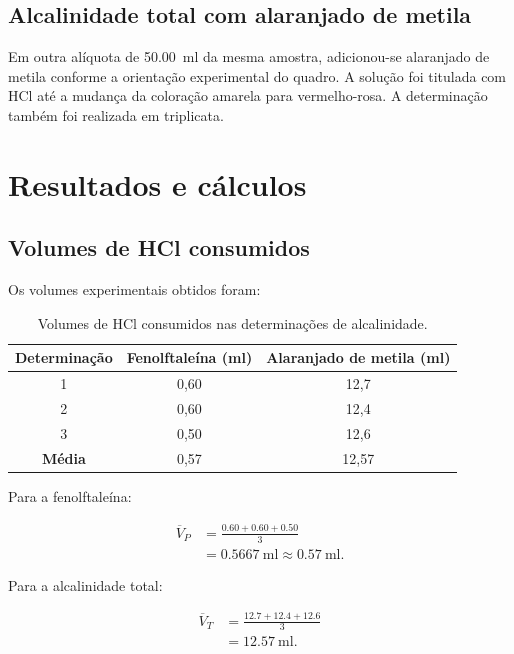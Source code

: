 \documentclass[a4paper,12pt]{article}
\newcommand{\VolAmostra}{50.00}
\begin{document}
\subsection{Alcalinidade total com alaranjado de metila}

Em outra alíquota de \qty{\VolAmostra}{\milli\litre} da mesma amostra,
adicionou-se alaranjado de metila conforme a orientação experimental do
quadro. A solução foi titulada com HCl até a mudança da coloração amarela
para vermelho-rosa. A determinação também foi realizada em triplicata.

\section{Resultados e cálculos}

\subsection{Volumes de HCl consumidos}

Os volumes experimentais obtidos foram:

\begin{table}[H]
\centering
\caption{Volumes de HCl consumidos nas determinações de alcalinidade.}
\label{tab:volumes}
\begin{tabular}{
c
S[table-format=2.2]
S[table-format=2.1]
}
\toprule
\textbf{Determinação}
& {\textbf{Fenolftaleína} (\si{\milli\litre})}
& {\textbf{Alaranjado de metila} (\si{\milli\litre})}\\
 & 0,60 & 12,7\\
2 & 0,60 & 12,4\\
3 & 0,50 & 12,6\\
\midrule
\textbf{Média} & 0,57 & 12,57\\
\bottomrule
\end{tabular}
\end{table}

Para a fenolftaleína:

\begin{align}
\overline{V}_{P}
&=
\frac{0.60+0.60+0.50}{3}\\
&=
\qty{0.5667}{\milli\litre}
\approx
\boxed{\qty{0.57}{\milli\litre}}.
\end{align}

Para a alcalinidade total:

\begin{align}
\overline{V}_{T}
&=
\frac{12.7+12.4+12.6}{3}\\
&=
\boxed{\qty{12.57}{\milli\litre}}.
\end{align}
\end{document}
